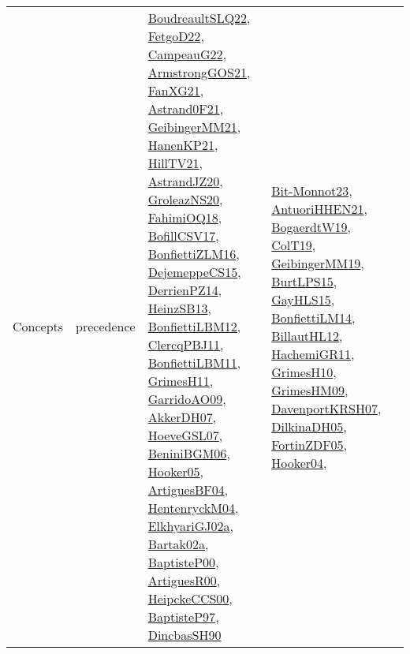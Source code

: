 {\begin{longtable}{lp{3cm}>{\raggedright}p{6cm}>{\raggedright}p{6cm}p{8cm}}
Concepts & precedence & \href{papers/BoudreaultSLQ22.pdf}{BoudreaultSLQ22}\cite{BoudreaultSLQ22}, \href{articles/FetgoD22.pdf}{FetgoD22}\cite{FetgoD22}, \href{articles/CampeauG22.pdf}{CampeauG22}\cite{CampeauG22}, \href{papers/ArmstrongGOS21.pdf}{ArmstrongGOS21}\cite{ArmstrongGOS21}, \href{articles/FanXG21.pdf}{FanXG21}\cite{FanXG21}, \href{papers/Astrand0F21.pdf}{Astrand0F21}\cite{Astrand0F21}, \href{papers/GeibingerMM21.pdf}{GeibingerMM21}\cite{GeibingerMM21}, \href{papers/HanenKP21.pdf}{HanenKP21}\cite{HanenKP21}, \href{papers/HillTV21.pdf}{HillTV21}\cite{HillTV21}, \href{articles/AstrandJZ20.pdf}{AstrandJZ20}\cite{AstrandJZ20}, \href{papers/GroleazNS20.pdf}{GroleazNS20}\cite{GroleazNS20}, \href{articles/FahimiOQ18.pdf}{FahimiOQ18}\cite{FahimiOQ18}, \href{papers/BofillCSV17.pdf}{BofillCSV17}\cite{BofillCSV17}, \href{papers/BonfiettiZLM16.pdf}{BonfiettiZLM16}\cite{BonfiettiZLM16}, \href{papers/DejemeppeCS15.pdf}{DejemeppeCS15}\cite{DejemeppeCS15}, \href{papers/DerrienPZ14.pdf}{DerrienPZ14}\cite{DerrienPZ14}, \href{articles/HeinzSB13.pdf}{HeinzSB13}\cite{HeinzSB13}, \href{papers/BonfiettiLBM12.pdf}{BonfiettiLBM12}\cite{BonfiettiLBM12}, \href{papers/ClercqPBJ11.pdf}{ClercqPBJ11}\cite{ClercqPBJ11}, \href{papers/BonfiettiLBM11.pdf}{BonfiettiLBM11}\cite{BonfiettiLBM11}, \href{papers/GrimesH11.pdf}{GrimesH11}\cite{GrimesH11}, \href{articles/GarridoAO09.pdf}{GarridoAO09}\cite{GarridoAO09}, \href{papers/AkkerDH07.pdf}{AkkerDH07}\cite{AkkerDH07}, \href{papers/HoeveGSL07.pdf}{HoeveGSL07}\cite{HoeveGSL07}, \href{papers/BeniniBGM06.pdf}{BeniniBGM06}\cite{BeniniBGM06}, \href{articles/Hooker05.pdf}{Hooker05}\cite{Hooker05}, \href{papers/ArtiguesBF04.pdf}{ArtiguesBF04}\cite{ArtiguesBF04}, \href{papers/HentenryckM04.pdf}{HentenryckM04}\cite{HentenryckM04}, \href{papers/ElkhyariGJ02a.pdf}{ElkhyariGJ02a}\cite{ElkhyariGJ02a}, \href{papers/Bartak02a.pdf}{Bartak02a}\cite{Bartak02a}, \href{articles/BaptisteP00.pdf}{BaptisteP00}\cite{BaptisteP00}, \href{articles/ArtiguesR00.pdf}{ArtiguesR00}\cite{ArtiguesR00}, \href{articles/HeipckeCCS00.pdf}{HeipckeCCS00}\cite{HeipckeCCS00}, \href{papers/BaptisteP97.pdf}{BaptisteP97}\cite{BaptisteP97}, \href{articles/DincbasSH90.pdf}{DincbasSH90}\cite{DincbasSH90} & \href{papers/Bit-Monnot23.pdf}{Bit-Monnot23}\cite{Bit-Monnot23}, \href{papers/AntuoriHHEN21.pdf}{AntuoriHHEN21}\cite{AntuoriHHEN21}, \href{papers/BogaerdtW19.pdf}{BogaerdtW19}\cite{BogaerdtW19}, \href{papers/ColT19.pdf}{ColT19}\cite{ColT19}, \href{papers/GeibingerMM19.pdf}{GeibingerMM19}\cite{GeibingerMM19}, \href{papers/BurtLPS15.pdf}{BurtLPS15}\cite{BurtLPS15}, \href{papers/GayHLS15.pdf}{GayHLS15}\cite{GayHLS15}, \href{papers/BonfiettiLM14.pdf}{BonfiettiLM14}\cite{BonfiettiLM14}, \href{papers/BillautHL12.pdf}{BillautHL12}\cite{BillautHL12}, \href{articles/HachemiGR11.pdf}{HachemiGR11}\cite{HachemiGR11}, \href{papers/GrimesH10.pdf}{GrimesH10}\cite{GrimesH10}, \href{papers/GrimesHM09.pdf}{GrimesHM09}\cite{GrimesHM09}, \href{papers/DavenportKRSH07.pdf}{DavenportKRSH07}\cite{DavenportKRSH07}, \href{papers/DilkinaDH05.pdf}{DilkinaDH05}\cite{DilkinaDH05}, \href{papers/FortinZDF05.pdf}{FortinZDF05}\cite{FortinZDF05}, \href{papers/Hooker04.pdf}{Hooker04}\cite{Hooker04}, 
\end{longtable}}
